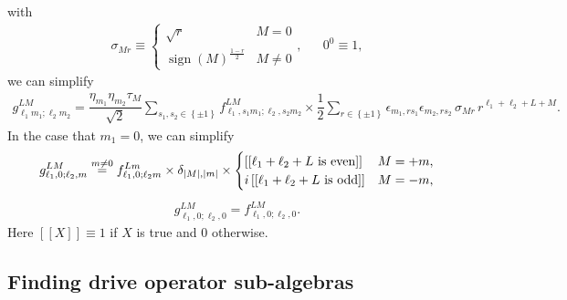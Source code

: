 \documentclass[nofootinbib,notitlepage,11pt]{revtex4-2}
\renewcommand{\t}{\text} %
\newcommand{\f}[2]{\dfrac{#1}{#2}} %
\newcommand{\p}[1]{\left(#1\right)} %
\renewcommand{\sp}[1]{\left[#1\right]} %
\renewcommand{\set}[1]{\left\{#1\right\}} %
\newcommand{\1}{\mathds{1}}
\DeclareMathOperator{\sign}{sign}
\begin{document}
with
\begin{align}
  \sigma_{Mr} \equiv
  \begin{cases}
    \sqrt{r} & M = 0 \\
    \sign\p{M}^{\frac{1-r}{2}} & M \ne 0
  \end{cases},
  &&
  0^0 \equiv 1,
\end{align}
we can simplify
\begin{align}
  g_{\ell_1m_1;\ell_2m_2}^{LM}
  = \f{\eta_{m_1}\eta_{m_2}\tau_M}{\sqrt2}
  \sum_{s_1,s_2\in\set{\pm1}} f_{\ell_1,s_1m_1;\ell_2,s_2m_2}^{LM}
  \times \f12 \sum_{r\in\set{\pm1}}
  \epsilon_{m_1,r s_1} \epsilon_{m_2,r s_2} \,
  \sigma_{Mr} \, r^{\ell_1+\ell_2+L+M}.
  \label{eq:drive_struct}
\end{align}
In the case that $m_1=0$, we can simplify
\begin{align}
  g_{\ell_1,0;\ell_2,m}^{LM}
  \stackrel{m\ne 0}{=} f_{\ell_1,0;\ell_2 m}^{Lm}
  \times \delta_{\abs{M},\abs{m}} \times
  \begin{cases}
    \sp{\sp{\ell_1+\ell_2+L~\t{is even}}} & M = +m, \\
    i \sp{\sp{\ell_1+\ell_2+L~\t{is odd}}} & M = -m,
  \end{cases}
\end{align}
\begin{align}
  g_{\ell_1,0;\ell_2,0}^{LM} = f_{\ell_1,0;\ell_2,0}^{LM}.
\end{align}
Here $\sp{\sp{X}}\equiv1$ if $X$ is true and $0$ otherwise.

\subsection{Finding drive operator sub-algebras}
\end{document}
